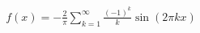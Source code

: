\documentclass[preview]{standalone}
\begin{document}
\begin{align*}
f(x) = -\frac{2}{\pi} \sum_{k=1}^{\infty} \frac{(-1)^k}{k}\sin(2\pi k x)
\end{align*}
\end{document}
